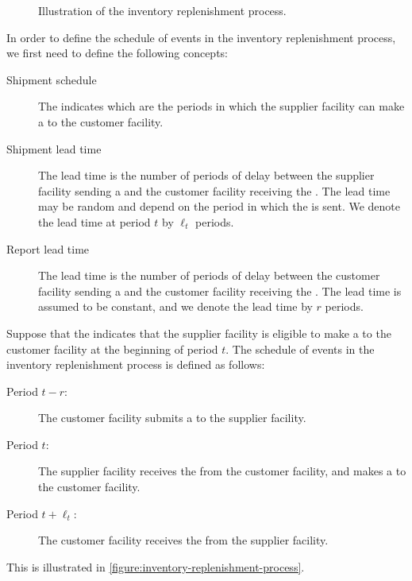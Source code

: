 \begin{figure}[h!]
\caption{Illustration of the inventory replenishment process.}
\label{figure:inventory-replenishment-process}
\end{figure}

In order to define the schedule of events
in the inventory replenishment process,
we first need to define the following concepts:
\begin{description}
  \item[Shipment schedule] 
      The  indicates which are the periods
      in which the supplier facility can make a 
      to the customer facility.
  \item[Shipment lead time]
      The  lead time is the number of periods of delay
      between the supplier facility sending a 
      and the customer facility receiving the .
      The  lead time may be random
      and depend on the period in which the  is sent.
      We denote the  lead time at period $t$
      by $\ell_t$ periods.
  \item[Report lead time]
      The  lead time is the number of periods of delay
      between the customer facility sending a 
      and the customer facility receiving the .
      The  lead time is assumed to be constant,
      and we denote the  lead time by $r$ periods.
\end{description}

Suppose that the 
indicates that the supplier facility
is eligible to make a 
to the customer facility at the beginning of period $t$.
The schedule of events in the inventory replenishment process
is defined as follows:
\begin{description}
  \item[Period $t - r$:]
      The customer facility submits a 
      to the supplier facility.
  \item[Period $t$:]
      The supplier facility receives the 
      from the customer facility,
      and makes a  to the customer facility.
  \item[Period $t + \ell_t$:]
      The customer facility receives the 
      from the supplier facility.
\end{description}
This is illustrated in 
\autoref{figure:inventory-replenishment-process}.






